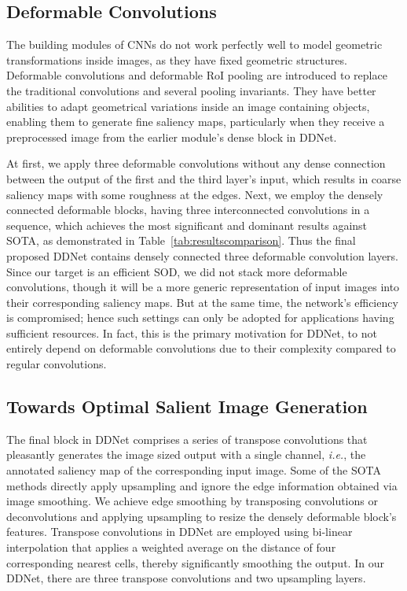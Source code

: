 \documentclass{article}
\newcommand{\latinphrase}[1]{\textit{#1}}
\newcommand{\ie}{\latinphrase{i.e.}\xspace}
\begin{document}
\subsection{Deformable Convolutions}
The building modules of CNNs do not work perfectly well to model geometric transformations inside images, as they have fixed geometric structures. Deformable convolutions and deformable RoI pooling are introduced to replace the traditional convolutions and several pooling invariants. They have better abilities to adapt geometrical variations inside an image containing objects, enabling them to generate fine saliency maps, particularly when they receive a preprocessed image from the earlier module's dense block in DDNet.

At first, we apply three deformable convolutions without any dense connection between the output of the first and the third layer's input, which results in coarse saliency maps with some roughness at the edges. Next, we employ the densely connected deformable blocks, having three interconnected convolutions in a sequence, which achieves the most significant and dominant results against SOTA, as demonstrated in Table~\ref{tab:resultscomparison}. Thus the final proposed DDNet contains densely connected three deformable convolution layers. Since our target is an efficient SOD, we did not stack more deformable convolutions, though it will be a more generic representation of input images into their corresponding saliency maps. But at the same time, the network's efficiency is compromised; hence such settings can only be adopted for applications having sufficient resources. In fact, this is the primary motivation for DDNet, to not entirely depend on deformable convolutions due to their complexity compared to regular convolutions.

\subsection{Towards Optimal Salient Image Generation}
The final block in DDNet comprises a series of transpose convolutions that pleasantly generates the image sized output with a single channel, \ie, the annotated saliency map of the corresponding input image. Some of the SOTA methods directly apply upsampling and ignore the edge information obtained via image smoothing. We achieve edge smoothing by transposing convolutions or deconvolutions and applying upsampling to resize the densely deformable block's features. Transpose convolutions in DDNet are employed using bi-linear interpolation that applies a weighted average on the distance of four corresponding nearest cells, thereby significantly smoothing the output. In our DDNet, there are three transpose convolutions and two upsampling layers.
\end{document}
